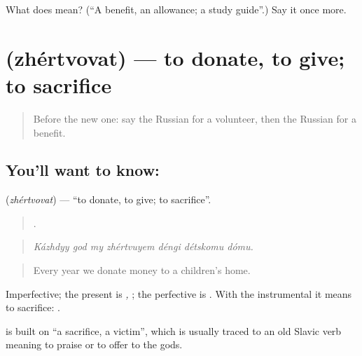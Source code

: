 \begin{tcolorbox}[breakable,colback=teal!4,colframe=teal!35!black,title={Before you move on}]
What does  mean? (\textquotedblleft{}A benefit, an allowance; a study guide\textquotedblright{}.) Say it once more.
\end{tcolorbox}
\section[\texorpdfstring{\ru{жертвовать} (zhértvovat)}{жертвовать (zhértvovat)}]{ (zhértvovat) — to donate, to give; to sacrifice}

\label{lesson:RU-C368-zhertvovat}



\begin{quote}
Before the new one: say the Russian for a volunteer, then the Russian for a benefit.
\end{quote}

\subsection*{You'll want to know: }
\textbf{} (\emph{zhértvovat}) — \textquotedblleft{}to donate, to give; to sacrifice\textquotedblright{}.

\begin{quote}
      .
\end{quote}

\begin{quote}
\emph{Kázhdyy god my zhértvuyem déngi détskomu dómu.}
\end{quote}

\begin{quote}
Every year we donate money to a children’s home.
\end{quote}

Imperfective; the present is \emph{, }; the perfective is \emph{}. With the instrumental it means to sacrifice: \emph{ }.

\begin{cousinweb}
\textbf{} is built on \emph{} \textquotedblleft{}a sacrifice, a victim\textquotedblright{}, which is usually traced to an old Slavic verb meaning to praise or to offer to the gods.
\end{cousinweb}


